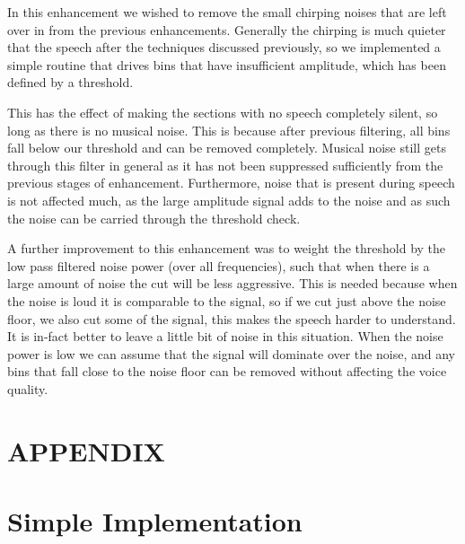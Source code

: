\documentclass[11pt]{article} %
\begin{document}
\begin{raggedright}
In this enhancement we wished to remove the small chirping noises that are left over in from the previous enhancements. Generally the chirping is much quieter that the speech after the techniques discussed previously, so we implemented a simple routine that drives bins that have insufficient amplitude, which has been defined by a threshold. 

This has the effect of making the sections with no speech completely silent, so long as there is no musical noise. This is because after previous filtering, all bins fall below our threshold and can be removed completely. Musical noise still gets through this filter in general as it has not been suppressed sufficiently from the previous stages of enhancement. Furthermore, noise that is present during speech is not affected much, as the large amplitude signal adds to the noise and as such the noise can be carried through the threshold check. 

A further improvement to this enhancement was to weight the threshold by the low pass filtered noise power (over all frequencies), such that when there is a large amount of noise the cut will be less aggressive. This is needed because when the noise is loud it is comparable to the signal, so if we cut just above the noise floor, we also cut some of the signal, this makes the speech harder to understand. It is in-fact better to leave a little bit of noise in this situation. When the noise power is low we can assume that the signal will dominate over the noise, and any bins that fall close to the noise floor can be removed without affecting the voice quality.  




\end{raggedright}

\section{APPENDIX} 
\appendix
\section{Simple Implementation} 
\label{app:simple}
\end{document}
